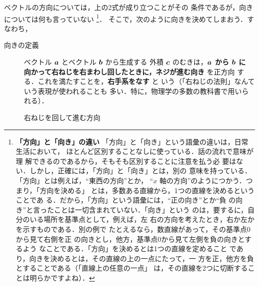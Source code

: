                 ベクトルの方向については，上の2式が成り立つことがその
                条件であるが，向きについては何も言っていない
                    \footnote{
                        \textbf{「方向」と「向き」の違い}\quad
                        「方向」と「向き」という語彙の違いは，日常生活において，
                        ほとんど区別することなしに使っている．話の流れで意味が理
                        解できるのであるから，そもそも区別することに注意を払う必
                        要はない．しかし，正確には，「方向」と「向き」とは，別の
                        意味を持っている．「方向」とは例えば，“東西の方向”とか，
                        “$x$ 軸の方向”のようにつかう．つまり，「方向を決める」
                        とは，多数ある直線から，1つの直線を決めるということであ
                        る．だから，「方向」という語彙には，“正の向き”とか“負
                        の向き”と言ったことは一切含まれていない．「向き」という
                        のは，要するに，自分のいる場所を基準点として，例えば，左
                        右の方向を考えたとき，右か左かを示すものである．別の例で
                        たとえるなら，数直線があって，その基準点0から見て右側を正
                        の向きとし，他方，基準点0から見て左側を負の向きとするよう
                        なことである．「方向」を決めるとは1つの直線を定めること
                        であり，向きを決めるとは，その直線の上の一点にたって，一
                        方を正，他方を負とすることである（「直線上の任意の一点」
                        は，その直線を2つに切断することは明らかですよね）．
                    }．
                そこで，次のように向きを決めてしまおう．すなわち，
                    \begin{description}
                        \item[向きの定義]
                            ベクトル $\boldsymbol{a}$ とベクトル $\boldsymbol{b}$ から生成する
                            外積 $\boldsymbol{c}$ のむきは，\textbf{$\boldsymbol{a}$ から $\boldsymbol{b}$ に
                            向かって右ねじを右まわし回したときに，ネジが進む向き} を正方向
                            する．これを満たすことを，\textbf{右手系をなす} と
                            いう（「右ねじの法則」なんていう表現が使われることも
                            多い．特に，物理学の多数の教科書で用いられる）．
                    \end{description}

                    \begin{figure}[hbt]
                        \begin{center}
                            \caption{右ねじを回して進む方向}
                            \label{fig:migineji_01}
                        \end{center}
                    \end{figure}

